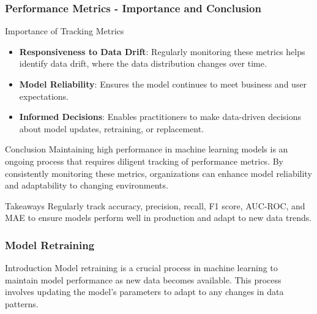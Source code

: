 \documentclass[aspectratio=169]{beamer}
\begin{document}
\begin{frame}[fragile]
    \frametitle{Performance Metrics - Importance and Conclusion}
    \begin{block}{Importance of Tracking Metrics}
        \begin{itemize}
            \item \textbf{Responsiveness to Data Drift}: Regularly monitoring these metrics helps identify data drift, where the data distribution changes over time.
            \item \textbf{Model Reliability}: Ensures the model continues to meet business and user expectations.
            \item \textbf{Informed Decisions}: Enables practitioners to make data-driven decisions about model updates, retraining, or replacement.
        \end{itemize}
    \end{block}

    \begin{block}{Conclusion}
        Maintaining high performance in machine learning models is an ongoing process that requires diligent tracking of performance metrics. By consistently monitoring these metrics, organizations can enhance model reliability and adaptability to changing environments.
    \end{block}
    
    \begin{block}{Takeaways}
        Regularly track accuracy, precision, recall, F1 score, AUC-ROC, and MAE to ensure models perform well in production and adapt to new data trends.
    \end{block}
\end{frame}

\begin{frame}[fragile]
    \frametitle{Model Retraining}
    \begin{block}{Introduction}
        Model retraining is a crucial process in machine learning to maintain model performance as new data becomes available. This process involves updating the model's parameters to adapt to any changes in data patterns.
    \end{block}
\end{frame}
\end{document}
